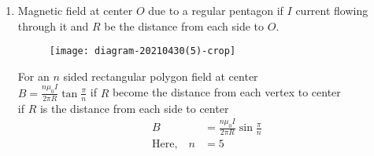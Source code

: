 \begin{enumerate}[ label=\color{ocre}\textbf{\arabic*.}]
\begin{answer}
\begin{align*}
		\text{Field at $O$ due to $PQ$}\\
		B_2&=\frac{\mu_0I}{2a}\times\frac{2\pi-\phi}{2\pi}\\
		\text{So total field at B}\\
		B&=B_1+B_2\\
		&=\frac{\mu_0I}{4\pi}\left( \frac{\phi}{b}+\frac{2\pi-\phi}{a}\right) \\
		\end{align*}
		\textbf{(b)}
		\begin{align*}
		\text{Field at $O$ due to arc $pQ$}\\
		B_1&=\frac{\mu_0I}{2a}\times\frac{3\frac{\pi}{2}}{2\pi}\\
		=&\frac{\mu_0I}{2a}\times\frac{3}{4}
		\intertext{Field at $O$ due to $PT$ \ and\ $QR$\ are zero. Field at $O$ due to $ST$ and $RS$.}
		B_2=\ B_3&=\frac{\mu_0I}{4\pi b}(\sin\theta_2-\sin\theta_1)\\
		&=\frac{\mu_0I}{4\pi b}\sin45\hspace{3cm}\theta_2=45,\quad \theta_{1}=0\\
		&=\frac{\mu_0I}{4\pi b}\times\frac{1}{\sqrt{2}}\\
		\intertext{Total field at \ $O$,}
		B&=B_1+B_2+B_3\\
		&=\frac{\mu_0I}{2a}\times\frac{3}{4}+2\times\frac{\mu_0}{4\pi b}\times\frac{1}{\sqrt{2}}\\
		&=\frac{\mu_0I}{4\pi}\left[\frac{3\pi}{2a}+\frac{\sqrt{2}}{b} \right] 
		\end{align*}
	\end{answer}
	\item Magnetic field at center $O$ due to a regular pentagon if $I$ current flowing through it and $R$ be the distance from each side to $O$.
	\begin{figure}[H]
		\begin{center}
			\texttt{[image: diagram-20210430(5)-crop]}
		\end{center}
	\end{figure}
	\begin{answer}
		For an $n$ sided rectangular polygon field at center\\
		$B=\frac{n\mu_0I}{2\pi R}\tan\frac{\pi}{n}$ if $R$ become the distance from each vertex to center\\
		if $R$ is the distance from each side to center  
		\begin{align*}
		B&=\frac{n\mu_0I}{2\pi R}\sin\frac{\pi}{n}\\
		\text{Here,}\quad n&=5\quad \\

\end{align*}
\end{answer}
\end{enumerate}
